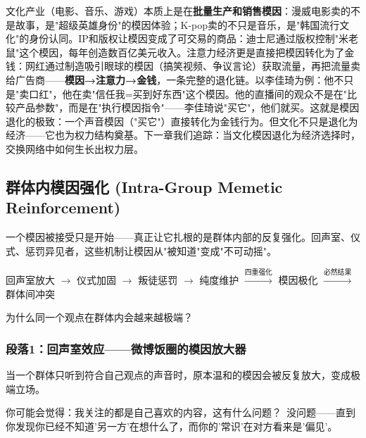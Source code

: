 \documentclass[../main.tex]{subfiles}
\begin{document}
文化产业（电影、音乐、游戏）本质上是在\textbf{批量生产和销售模因}：漫威电影卖的不是故事，是"超级英雄身份"的模因体验；K-pop卖的不只是音乐，是"韩国流行文化"的身份认同。IP和版权让模因变成了可交易的商品：迪士尼通过版权控制"米老鼠"这个模因，每年创造数百亿美元收入。注意力经济更是直接把模因转化为了金钱：网红通过制造吸引眼球的模因（搞笑视频、争议言论）获取流量，再把流量卖给广告商——\textbf{模因→注意力→金钱}，一条完整的退化链。以李佳琦为例：他不只是"卖口红"，他在卖"信任我=买到好东西"这个模因。他的直播间的观众不是在"比较产品参数"，而是在"执行模因指令"——李佳琦说"买它"，他们就买。这就是模因退化的极致：一个声音模因（"买它"）直接转化为金钱行为。但文化不只是退化为经济——它也为权力结构奠基。下一章我们追踪：当文化模因退化为经济选择时，交换网络中如何生长出权力层。

	\subsection{群体内模因强化 (Intra-Group Memetic Reinforcement)}

	\begin{motivation}

		一个模因被接受只是开始——真正让它扎根的是群体内部的反复强化。回声室、仪式、惩罚异见者，这些机制让模因从"被知道"变成"不可动摇"。

	\end{motivation}

	\begin{logicmap}

		回声室放大 $\rightarrow$ 仪式加固 $\rightarrow$ 叛徒惩罚 $\rightarrow$ 纯度维护 $\xrightarrow{\text{四重强化}}$ 模因极化 $\xrightarrow{\text{必然结果}}$ 群体间冲突

	\end{logicmap}

	\begin{questionbox}

		为什么同一个观点在群体内会越来越极端？

	\end{questionbox}

	\subsubsection*{段落1：回声室效应——微博饭圈的模因放大器}

	当一个群体只听到符合自己观点的声音时，原本温和的模因会被反复放大，变成极端立场。

	\begin{tcolorbox}[colback=yellow!5, title=\textit{读者行为预测}]

		你可能会觉得：我关注的都是自己喜欢的内容，这有什么问题？\ 没问题——直到你发现你已经不知道'另一方'在想什么了，而你的'常识'在对方看来是'偏见'。

	\end{tcolorbox}
\end{document}
